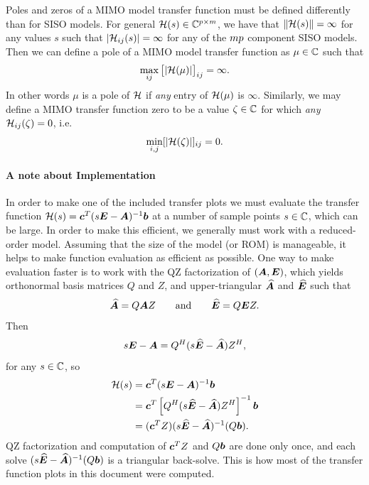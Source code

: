   Poles and zeros of a MIMO model transfer function must be defined differently than for SISO models. For general $\mathcal{H}(s)\in\mathbb{C}^{p \times m}$, we have that $\| \mathcal{H}(s) \|=\infty$ for any values $s$ such that $| \mathcal{H}_{ij}(s) | =\infty$ for any of the $m p$ component SISO models.  Then we can define a pole of a MIMO model transfer function as $\mu\in\mathbb{C}$ such that 
\[
\max_{ij} \begin{bmatrix}  | \mathcal{H}(\mu)|\end{bmatrix}_{ij} = \infty.
\]
In other words $\mu$ is a pole of $\mathcal{H}$ if \emph{any} entry of $\mathcal{H}(\mu)$ is $\infty$.  
  Similarly, we may define a MIMO transfer function zero to be a value $\zeta\in\mathbb{C}$  for which \emph{any} $\mathcal{H}_{ij}(\zeta)=0$, i.e.
\[
\min_{i,j} [|\mathcal{H}(\zeta)|]_{ij} = 0.
\] 

\paragraph{A note about Implementation}
 In order to make one of the included transfer plots we must evaluate the transfer function $\mathcal{H}(s)=\bm{c}^T(s\bm{E}-\bm{A})^{-1}\bm{b}$ at a number of sample points $s\in\mathbb{C}$, which can be large.  In order to make this efficient, we generally must work with a reduced-order model.  Assuming that the size of the model (or ROM) is manageable, it helps to make function evaluation as efficient as possible.  One way to make evaluation faster is to work with the QZ factorization of $(\bm{A},\bm{E})$, which yields orthonormal basis matrices $Q$ and $Z$, and upper-triangular $\widehat{\bm{A}}$ and $\widehat{\bm{E}}$ such that 
\[
 \widehat{\bm{A}} = Q \bm{A} Z \qquad \text{and} \qquad \widehat{\bm{E}} = Q \bm{E} Z.
\]
Then
\[
s\bm{E}-\bm{A} = Q^H (s \widehat{\bm{E}} - \widehat{\bm{A}}) Z^H, 
\]
for any $s\in\mathbb{C}$, so 
\begin{align*}
\mathcal{H}(s) &= \bm{c}^T(s\bm{E}-\bm{A})^{-1}\bm{b} \\
&=  \bm{c}^T \left[ Q^H (s \widehat{\bm{E}} - \widehat{\bm{A}}) Z^H \right]^{-1} \bm{b}\\
&= (\bm{c}^T Z) (s \widehat{\bm{E}} - \widehat{\bm{A}})^{-1} (Q \bm{b}).
\end{align*}
QZ factorization and computation of $\bm{c}^T Z$ and $Q \bm{b}$ are done only once, and each solve   
$(s \widehat{\bm{E}} - \widehat{\bm{A}})^{-1} (Q \bm{b})$ is a triangular back-solve.  This is how most of the transfer function plots in this document were computed.

\clearpage

